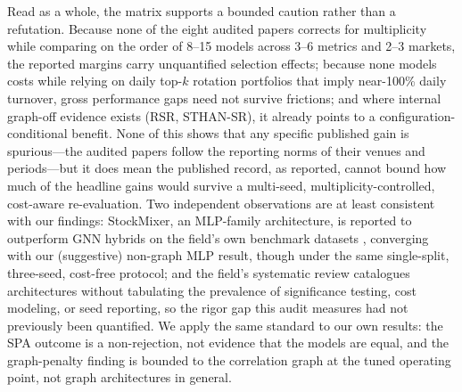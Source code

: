 \documentclass{article}
\begin{document}
Read as a whole, the matrix supports a bounded caution rather than a refutation. Because none of the eight audited papers corrects for multiplicity while comparing on the order of 8--15 models across 3--6 metrics and 2--3 markets, the reported margins carry unquantified selection effects; because none models costs while relying on daily top-$k$ rotation portfolios that imply near-100\% daily turnover, gross performance gaps need not survive frictions; and where internal graph-off evidence exists (RSR, STHAN-SR), it already points to a configuration-conditional benefit. None of this shows that any specific published gain is spurious---the audited papers follow the reporting norms of their venues and periods---but it does mean the published record, as reported, cannot bound how much of the headline gains would survive a multi-seed, multiplicity-controlled, cost-aware re-evaluation. Two independent observations are at least consistent with our findings: StockMixer, an MLP-family architecture, is reported to outperform GNN hybrids on the field's own benchmark datasets \citep{fan2024stockmixer}, converging with our (suggestive) non-graph MLP result, though under the same single-split, three-seed, cost-free protocol; and the field's systematic review \citep{patel2024survey} catalogues architectures without tabulating the prevalence of significance testing, cost modeling, or seed reporting, so the rigor gap this audit measures had not previously been quantified. We apply the same standard to our own results: the SPA outcome is a non-rejection, not evidence that the models are equal, and the graph-penalty finding is bounded to the correlation graph at the tuned operating point, not graph architectures in general.


\end{document}
